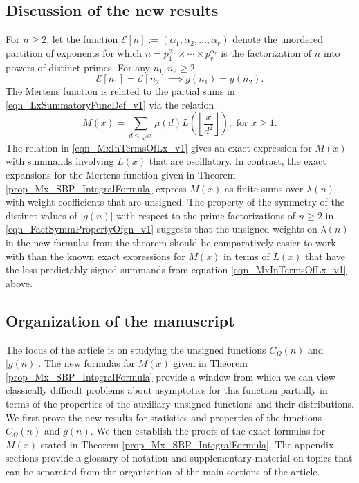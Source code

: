 \documentclass[11pt,reqno,a4letter]{article}
\newcommand{\hlocalref}[1]{\hyperref[#1]{\ref{#1}}}
\numberwithin{equation}{section}
\numberwithin{figure}{section}
\numberwithin{table}{section}
\newcommand{\Floor}[2]{\ensuremath{\left\lfloor \frac{#1}{#2} \right\rfloor}}
\theoremstyle{plain}
\numberwithin{theorem}{section}
\theoremstyle{definition}
\begin{document}
\subsection{Discussion of the new results}

For $n \geq 2$, let the function 
$\mathcal{E}[n] := (\alpha_1, \alpha_2, \ldots, \alpha_r)$ denote the unordered 
partition of exponents for which 
$n = p_1^{\alpha_1} \times \cdots \times p_r^{\alpha_r}$ is the factorization of 
$n$ into powers of distinct primes. 
For any $n_1,n_2 \geq 2$ 
\begin{equation}
\label{eqn_FactSymmPropertyOfgn_v1} 
\mathcal{E}[n_1] = \mathcal{E}[n_2] \implies g(n_1) = g(n_2). 
\end{equation}
The Mertens function is related to the partial sums in 
\eqref{eqn_LxSummatoryFuncDef_v1} 
via the relation \cite{HUMPHRIES-JNT-2013,LEHMAN-1960} 
\begin{equation}
\label{eqn_MxInTermsOfLx_v1} 
M(x) = \sum_{d \leq \sqrt{x}} \mu(d) L\left(\Floor{x}{d^2}\right), \text{ for } x \geq 1.
\end{equation}
The relation in \eqref{eqn_MxInTermsOfLx_v1} 
gives an exact expression for $M(x)$ with summands involving $L(x)$ that are oscillatory. 
In contrast, the exact expansions for the Mertens function given in 
Theorem \hlocalref{prop_Mx_SBP_IntegralFormula} 
express $M(x)$ as finite sums over $\lambda(n)$ with weight coefficients that are unsigned. 
The property of the symmetry of the distinct values of $|g(n)|$ with respect to the 
prime factorizations of $n \geq 2$ in \eqref{eqn_FactSymmPropertyOfgn_v1} 
suggests that the unsigned weights on $\lambda(n)$ in 
the new formulas from the theorem should be comparatively easier to work with than the known 
exact expressions for $M(x)$ in terms of $L(x)$ 
that have the less predictably signed summands from 
equation \eqref{eqn_MxInTermsOfLx_v1} above.

\subsection{Organization of the manuscript}

The focus of the article is on studying the unsigned functions 
$C_{\Omega}(n)$ and $|g(n)|$. 
The new formulas for $M(x)$ given in 
Theorem \hlocalref{prop_Mx_SBP_IntegralFormula} 
provide a window from which we can view classically  
difficult problems about asymptotics for this function partially in terms of the 
properties of the auxiliary unsigned functions and their distributions. 
We first prove the new results for statistics and properties of the functions 
$C_{\Omega}(n)$ and $g(n)$. We then establish the proofs of the 
exact formulas for $M(x)$ stated in 
Theorem \hlocalref{prop_Mx_SBP_IntegralFormula}. 
The appendix sections provide a glossary of notation and 
supplementary material on topics that can be separated from the 
organization of the main sections of the article. 
\end{document}
